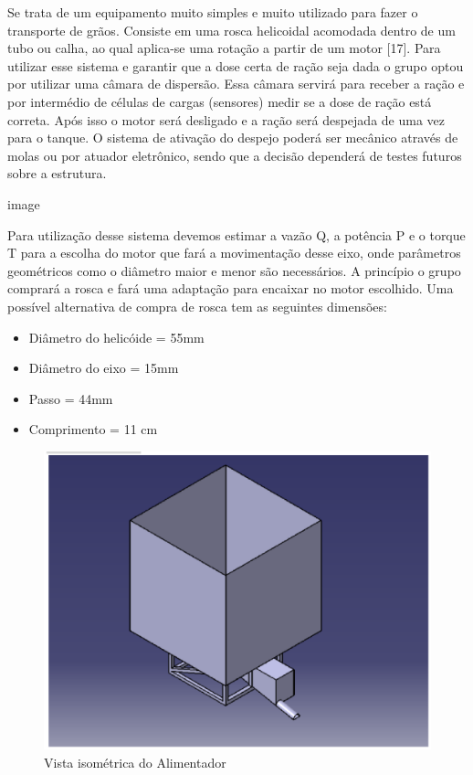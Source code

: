Se trata de um equipamento muito simples e muito utilizado para fazer o transporte de grãos. Consiste em uma rosca helicoidal acomodada dentro de um tubo ou calha, ao qual aplica-se uma rotação a partir de um motor [17]. Para utilizar esse sistema e garantir que a dose certa de ração seja dada o grupo optou por utilizar uma câmara de dispersão. Essa câmara servirá para receber a ração e por intermédio de células de cargas (sensores) medir se a dose de ração está correta. Após isso o motor será desligado e a ração será despejada de uma vez para o tanque. O sistema de ativação do despejo poderá ser mecânico através de molas ou por atuador eletrônico, sendo que a decisão dependerá de testes futuros sobre a estrutura.

image

Para utilização desse sistema devemos estimar a vazão Q, a potência P e o torque T para a escolha do motor que fará a movimentação desse eixo, onde parâmetros geométricos como o diâmetro maior e menor são necessários. A princípio o grupo comprará a rosca e fará uma adaptação para encaixar no motor escolhido. Uma possível alternativa de compra de rosca tem as seguintes dimensões:

\begin{itemize}
  \item Diâmetro do helicóide = 55mm
  \item Diâmetro do eixo = 15mm
  \item Passo = 44mm
  \item Comprimento = 11 cm
\end{itemize}

\begin{figure}[H]
 \centering
   \includegraphics[keepaspectratio=true,scale=0.8]{figuras/vista_iso_alimentador.eps}
 \caption{Vista isométrica do Alimentador}
 \label{vista_iso_alimentador}
\end{figure}

